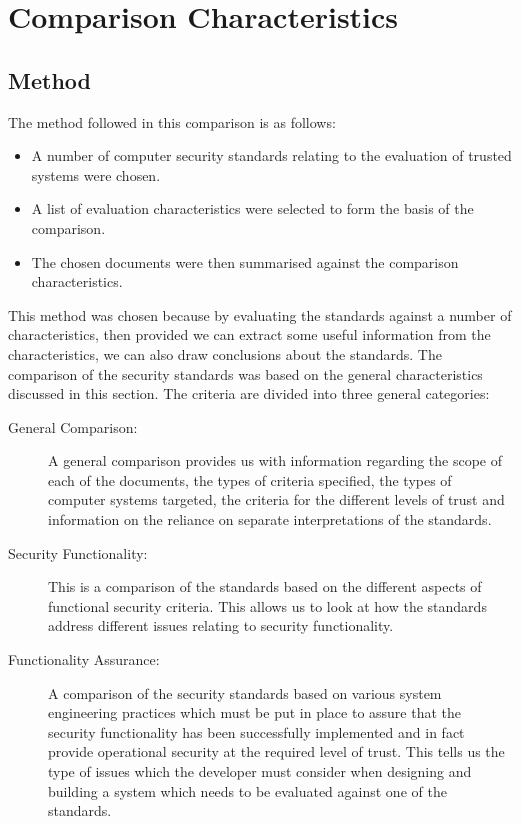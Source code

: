 \chapter{Comparison Characteristics}

    \section{Method}
    The method followed in this comparison is as follows:
    \begin{itemize}
        \item A number of computer security standards relating to
              the evaluation of trusted systems were chosen.
        \item A list of evaluation characteristics were selected to
              form the basis of the comparison.
        \item The chosen documents were then summarised 
              against the comparison characteristics.
    \end{itemize}
    This method was chosen because by evaluating the standards
    against a number of characteristics, then provided we can extract some
    useful information from the characteristics, we can also draw conclusions
    about the standards.
    The comparison of the security standards was based on the
    general characteristics discussed in this section. 
    The criteria are divided into three general categories:
        \begin{description}
            \item[General Comparison:] 
                A general comparison provides us with information
                regarding the scope of each of the documents, the types
                of criteria specified, the types of computer systems
                targeted, the criteria for the different levels of trust
                and information on the reliance on separate
                interpretations of the standards.
            \item[Security Functionality:] 
                This is a comparison of the
                standards based on the different aspects of functional
                security criteria. This allows us to look at how the standards
                address different issues relating to security functionality.
            \item[Functionality Assurance:] A comparison of the
                security standards based on various system engineering
                practices which must be put in place to assure that the
                security functionality has been successfully implemented
                and in fact provide operational security at the required
                level of trust. This tells us the type of issues which the
                developer must consider when designing and building a system
                which needs to be evaluated against one of the standards.
        \end{description}

